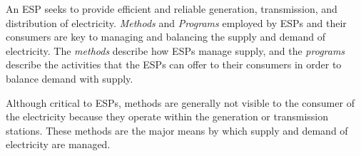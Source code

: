 %
%
%
\label{sub:EPP}
An ESP seeks to provide efficient and reliable generation, transmission, and 
distribution of electricity. \emph{Methods} and \emph{Programs} employed by ESPs and their consumers 
are key to managing and balancing the supply and demand of electricity. The \textit{methods} 
describe how ESPs manage supply, and the \textit{programs} describe the activities that 
the ESPs can offer to their consumers in order to balance demand with supply.

Although critical to ESPs, methods are generally not visible to the consumer of the electricity because they
operate within the generation or transmission stations. These methods are the major means by which supply and demand of electricity are managed.

